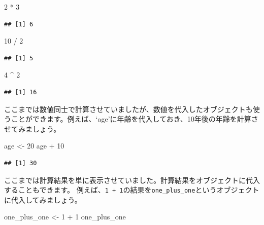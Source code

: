 \documentclass[
]{book}
\newenvironment{Shaded}{\begin{snugshade}}{\end{snugshade}}
\newcommand{\DecValTok}[1]{\textcolor[rgb]{0.00,0.00,0.81}{#1}}
\newcommand{\NormalTok}[1]{#1}
\newcommand{\OtherTok}[1]{\textcolor[rgb]{0.56,0.35,0.01}{#1}}
\newcommand{\SpecialCharTok}[1]{\textcolor[rgb]{0.00,0.00,0.00}{#1}}
\begin{document}
\begin{Shaded}
\begin{Highlighting}[]
\DecValTok{2} \SpecialCharTok{*} \DecValTok{3}
\end{Highlighting}
\end{Shaded}

\begin{verbatim}
## [1] 6
\end{verbatim}

\begin{Shaded}
\begin{Highlighting}[]
\DecValTok{10} \SpecialCharTok{/} \DecValTok{2}
\end{Highlighting}
\end{Shaded}

\begin{verbatim}
## [1] 5
\end{verbatim}

\begin{Shaded}
\begin{Highlighting}[]
\DecValTok{4} \SpecialCharTok{\^{}} \DecValTok{2}
\end{Highlighting}
\end{Shaded}

\begin{verbatim}
## [1] 16
\end{verbatim}

ここまでは数値同士で計算させていましたが、数値を代入したオブジェクトも使うことができます。例えば、`age'に年齢を代入しておき、10年後の年齢を計算させてみましょう。

\begin{Shaded}
\begin{Highlighting}[]
\NormalTok{age }\OtherTok{\textless{}{-}} \DecValTok{20}
\NormalTok{age }\SpecialCharTok{+} \DecValTok{10}
\end{Highlighting}
\end{Shaded}

\begin{verbatim}
## [1] 30
\end{verbatim}

ここまでは計算結果を単に表示させていました。計算結果をオブジェクトに代入することもできます。
例えば、\texttt{1\ +\ 1}の結果を\texttt{one\_plus\_one}というオブジェクトに代入してみましょう。

\begin{Shaded}
\begin{Highlighting}[]
\NormalTok{one\_plus\_one }\OtherTok{\textless{}{-}} \DecValTok{1} \SpecialCharTok{+} \DecValTok{1}
\NormalTok{one\_plus\_one}
\end{Highlighting}
\end{Shaded}
\end{document}
